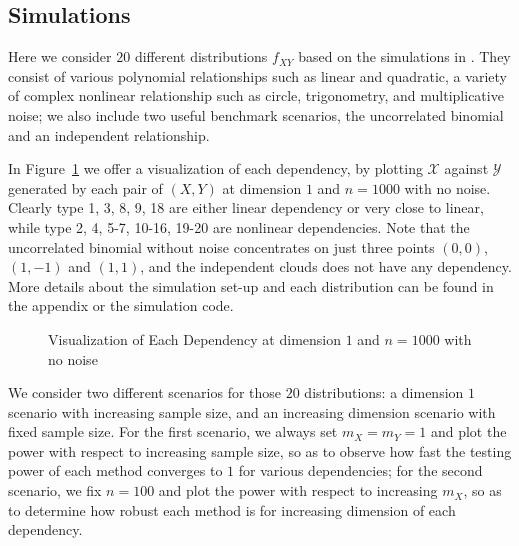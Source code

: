 \documentclass[12pt]{article}
\begin{document}
\subsection{Simulations}
\label{numer1}
Here we consider $20$ different distributions $f_{XY}$ based on the simulations in \cite{SzekelyRizzoBakirov2007, SimonTibshirani2012, GorfineHellerHeller2012, HellerGorfine2013}. They consist of various polynomial relationships such as linear and quadratic, a variety of complex nonlinear relationship such as circle, trigonometry, and multiplicative noise; we also include two useful benchmark scenarios, the uncorrelated binomial and an independent relationship. 

In Figure~\ref{fig0} we offer a visualization of each dependency, by plotting $\mathcal{X}$ against $\mathcal{Y}$ generated by each pair of $(X,Y)$ at dimension $1$ and $n=1000$ with no noise. Clearly type 1, 3, 8, 9, 18 are either linear dependency or very close to linear, while type 2, 4, 5-7, 10-16, 19-20 are nonlinear dependencies. Note that the uncorrelated binomial without noise concentrates on just three points $(0,0)$, $(1,-1)$ and $(1,1)$, and the independent clouds does not have any dependency. More details about the simulation set-up and each distribution can be found in the appendix or the simulation code.

\begin{figure}[htbp]
\caption{Visualization of Each Dependency at dimension $1$ and $n=1000$ with no noise}
\label{fig0}
\end{figure}

We consider two different scenarios for those $20$ distributions: a dimension $1$ scenario with increasing sample size, and an increasing dimension scenario with fixed sample size. For the first scenario, we always set $m_{X}=m_{Y}=1$ and plot the power with respect to increasing sample size, so as to observe how fast the testing power of each method converges to $1$ for various dependencies; for the second scenario, we fix $n=100$ and plot the power with respect to increasing $m_{X}$, so as to determine how robust each method is for increasing dimension of each dependency. 
\end{document}
